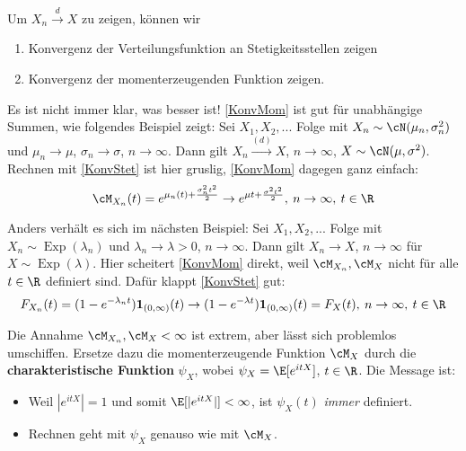 \begin{beispiel}
	Um $X_n \overset{d}{\longrightarrow} X$ zu zeigen, können wir
	\begin{enumerate}[label=(\roman*)]
		\item \label{KonvStet} Konvergenz der Verteilungsfunktion an Stetigkeitsstellen zeigen
		\item \label{KonvMom} Konvergenz der momenterzeugenden Funktion zeigen.
	\end{enumerate}
	Es ist nicht immer klar, was besser ist! \ref{KonvMom} ist gut für unabhängige Summen, wie folgendes Beispiel zeigt: Sei $X_1,X_2,...$ Folge mit $X_n \sim \cN(\mu_n, \sigma_n^2)$ und $\mu_n \to \mu$, $\sigma_n \to \sigma$, $n \to \infty$. Dann gilt $X_n \overset{(d)}{\longrightarrow} X$, $n \to \infty$, $X \sim \cN(\mu, \sigma^2)$. \newline
	Rechnen mit \ref{KonvStet} ist hier gruslig, \ref{KonvMom} dagegen ganz einfach: 
	\[ \cM_{X_n}(t) = e^{\mu_n(t) + \frac{\sigma_n^2t^2}{2}} \to e^{\mu t + \frac{\sigma^2 t^2}{2}}, \: n \to \infty, \: t \in \R \]
	 
	Anders verhält es sich im nächsten Beispiel: Sei $X_1,X_2,...$ Folge mit $X_n \sim \operatorname{Exp}(\lambda_n)$ und $\lambda_n \to \lambda > 0$, $n \to \infty$. Dann gilt $X_n \to X$, $n \to \infty$ für $X \sim \operatorname{Exp}(\lambda)$.\newline
	Hier scheitert \ref{KonvMom} direkt, weil $\cM_{X_n}, \cM_X$ nicht für alle $t \in \R$ definiert sind. Dafür klappt \ref{KonvStet} gut: 
	\[ F_{X_n}(t) = (1-e^{-\lambda_n t}) \mathbf{1}_{(0, \infty)}(t) \to (1-e^{-\lambda t}) \mathbf{1}_{(0, \infty)}(t) = F_X(t), \: n \to \infty, \: t \in \R \]
\end{beispiel}

\begin{bem1}
	Die Annahme $\cM_{X_n}, \cM_X < \infty$ ist extrem, aber lässt sich problemlos umschiffen. Ersetze dazu die momenterzeugende Funktion $\cM_X$ durch die \textbf{charakteristische Funktion} $\psi_X$, wobei $\psi_X = \E[e^{itX}]$, $t \in \R$. Die Message ist:
	\begin{itemize}
		\item Weil $|e^{itX}| = 1$ und somit $\E[|e^{itX}|] < \infty$, ist $\psi_X(t)$ \textit{immer} definiert.
		\item Rechnen geht mit $\psi_X$ genauso wie mit $\cM_X$.
	\end{itemize}
\end{bem1}

